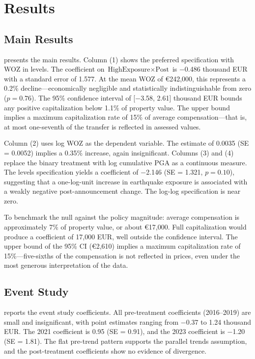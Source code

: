 \documentclass[12pt]{article}
\begin{document}
\section{Results}

\subsection{Main Results}



 presents the main results. Column (1) shows the preferred specification with WOZ in levels. The coefficient on $\text{HighExposure} \times \text{Post}$ is $-$0.486 thousand EUR with a standard error of 1.577. At the mean WOZ of \euro 242,000, this represents a 0.2\% decline---economically negligible and statistically indistinguishable from zero ($p = 0.76$). The 95\% confidence interval of [$-$3.58, 2.61] thousand EUR bounds any positive capitalization below 1.1\% of property value. The upper bound implies a maximum capitalization rate of 15\% of average compensation---that is, at most one-seventh of the transfer is reflected in assessed values.

Column (2) uses log WOZ as the dependent variable. The estimate of 0.0035 (SE = 0.0052) implies a 0.35\% increase, again insignificant. Columns (3) and (4) replace the binary treatment with log cumulative PGA as a continuous measure. The levels specification yields a coefficient of $-$2.146 (SE = 1.321, $p = 0.10$), suggesting that a one-log-unit increase in earthquake exposure is associated with a weakly negative post-announcement change. The log-log specification is near zero.

To benchmark the null against the policy magnitude: average compensation is approximately 7\% of property value, or about \euro 17,000. Full capitalization would produce a coefficient of 17,000 EUR, well outside the confidence interval. The upper bound of the 95\% CI (\euro 2,610) implies a maximum capitalization rate of 15\%---five-sixths of the compensation is not reflected in prices, even under the most generous interpretation of the data.

\subsection{Event Study}



 reports the event study coefficients. All pre-treatment coefficients (2016--2019) are small and insignificant, with point estimates ranging from $-$0.37 to 1.24 thousand EUR. The 2021 coefficient is 0.95 (SE = 0.91), and the 2023 coefficient is $-$1.20 (SE = 1.81). The flat pre-trend pattern supports the parallel trends assumption, and the post-treatment coefficients show no evidence of divergence.
\end{document}

